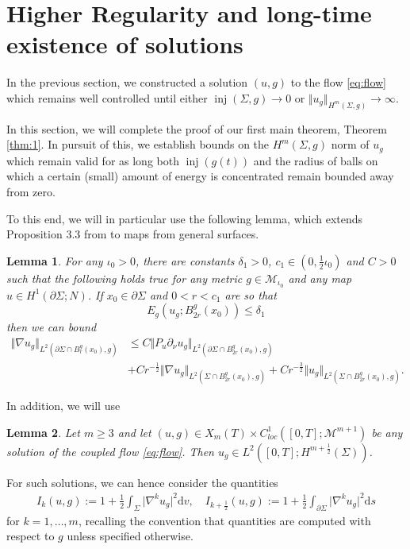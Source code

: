 \documentclass[10pt,reqno]{amsart}
\theoremstyle{plain}
\newtheorem{lemma}{Lemma}[section]
\theoremstyle{definition}
\numberwithin{equation}{section}
\newcommand{\de}{\delta}
\newcommand{\Si}{\Sigma}
\DeclareMathOperator{\inj}{inj}
\newcommand{\norm}[1]{\Vert#1\Vert}
\newcommand{\beqa}{\begin{equation}\begin{aligned}}
\newcommand{\eeqa}{\end{aligned}\end{equation}}
\newcommand{\half}{\frac{1}{2}}
\newcommand{\dd}{\mathrm{d}} %
\newcommand{\abs}[1]{\vert#1\vert}
\newcommand{\MM}{\mathcal{M}} %
\newcommand{\hf}{\frac{1}{2}} %
\newcommand{\p}{\partial} %
\begin{document}
\section{Higher Regularity and long-time existence of solutions}\label{sect:higher_reg}
In the previous section, we constructed a solution $(u,g)$ to the flow \eqref{eq:flow} which remains well controlled until either $\inj(\Si,g)\rightarrow 0$ or $\norm{u_g}_{H^m(\Si,g)}\rightarrow \infty$. 


In this section, we will complete the proof of our first main theorem, Theorem \ref{thm:1}. In pursuit of this, we establish bounds on the $H^m(\Si,g)$ norm of $u_g$ which remain valid for as long both $\inj(g(t))$ and the radius of balls on which a certain (small) amount of energy is concentrated remain bounded away from zero.



To this end, we will in particular use the following lemma, which extends Proposition 3.3 from \cite{S} to maps from general surfaces.

\begin{lemma}\label{lemma:loc_reg}
    For any $\iota_0>0$, there are constants $\de_1>0$,  $c_1\in (0,\half \iota_0)$ and $C>0$ such that the following holds true for any metric $g \in \MM_{\iota_0}$ and any map $u \in H^1(\p\Si;N)$. If $x_0 \in \p\Si$ and $0 < r < c_1$ are so that
    \begin{equation}\label{ass:E_small_f}
        E_g(u_g;B_{2r}^g(x_0)) \leq \de_1
    \end{equation}
    then we can bound 
    \beqa\label{est:H1_boundary}
        \norm{\nabla u_g}_{L^2(\p\Si\cap B_{r}^g(x_0),g)} &\leq C\norm{P_u \p_\nu u_g}_{L^2(\p\Si\cap B_{2r}^g(x_0),g)} \\
        &+ C r^{-\hf} \norm{\nabla u_g}_{L^2(\Si\cap B_{2r}^g(x_0),g)}+ Cr^{-\frac{3}{2}}\norm{u_g}_{L^2(\Si\cap B_{2r}^g(x_0),g)}.
    \eeqa
\end{lemma}

In addition, we will use 
\begin{lemma}\label{lemma:bit-more-regular}
    Let $m\geq 3$ and let $(u,g)\in X_{m}(T)\times C^1_{loc}([0,T];\MM^{m+1})$ be any solution of the coupled flow \eqref{eq:flow}. Then $u_g\in L^2([0,T]; H^{m+\half}(\Si))$.
\end{lemma}

For such solutions, we can hence consider the  quantities 
\begin{align}\label{def:I_k}
	I_k(u,g) := 1 + \hf\int_{\Si}\abs{\nabla^k u_g}^2 \dd v,\quad  I_{k+\hf}(u,g) := 1 + \hf\int_{\p\Si}\abs{\nabla^k u_g}^2 \dd s
\end{align}
for $k=1,\ldots,m$, recalling the convention that quantities are computed with respect to $g$ unless specified otherwise. 
\end{document}
